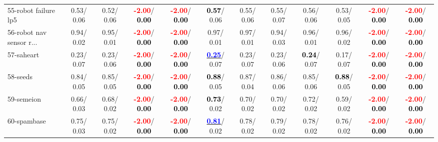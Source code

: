 \begin{table}[h]
\begin{center}
{\begin{tabular}{lc|c|c|c|c|c|c|c|c|c|c}
55-robot failure lp5 &   0.53/  0.06 &   0.52/  0.06 & \textcolor{red}{\textbf{ -2.00}}/\textcolor{black}{\textbf{  0.00}} & \textcolor{red}{\textbf{ -2.00}}/\textcolor{black}{\textbf{  0.00}} & \textcolor{black}{\textbf{  0.57}}/  0.06 &   0.55/  0.06 &   0.55/  0.07 &   0.56/  0.06 &   0.53/  0.05 & \textcolor{red}{\textbf{ -2.00}}/\textcolor{black}{\textbf{  0.00}} & \textcolor{red}{\textbf{ -2.00}}/\textcolor{black}{\textbf{  0.00}} \\
56-robot nav sensor r... &   0.94/  0.02 &   0.95/  0.01 & \textcolor{red}{\textbf{ -2.00}}/\textcolor{black}{\textbf{  0.00}} & \textcolor{red}{\textbf{ -2.00}}/\textcolor{black}{\textbf{  0.00}} &   0.97/  0.01 &   0.97/  0.01 &   0.94/  0.03 &   0.96/  0.01 &   0.96/  0.02 & \textcolor{red}{\textbf{ -2.00}}/\textcolor{black}{\textbf{  0.00}} & \textcolor{red}{\textbf{ -2.00}}/\textcolor{black}{\textbf{  0.00}} \\
57-saheart &   0.23/  0.07 &   0.23/  0.06 & \textcolor{red}{\textbf{ -2.00}}/\textcolor{black}{\textbf{  0.00}} & \textcolor{red}{\textbf{ -2.00}}/\textcolor{black}{\textbf{  0.00}} & \underline{\textcolor{blue}{\textbf{  0.25}}}/  0.07 &   0.23/  0.07 &   0.23/  0.06 & \textcolor{black}{\textbf{  0.24}}/  0.07 &   0.17/  0.07 & \textcolor{red}{\textbf{ -2.00}}/\textcolor{black}{\textbf{  0.00}} & \textcolor{red}{\textbf{ -2.00}}/\textcolor{black}{\textbf{  0.00}} \\
58-seeds &   0.84/  0.05 &   0.85/  0.05 & \textcolor{red}{\textbf{ -2.00}}/\textcolor{black}{\textbf{  0.00}} & \textcolor{red}{\textbf{ -2.00}}/\textcolor{black}{\textbf{  0.00}} & \textcolor{black}{\textbf{  0.88}}/  0.05 &   0.87/  0.04 &   0.86/  0.06 &   0.85/  0.06 & \textcolor{black}{\textbf{  0.88}}/  0.05 & \textcolor{red}{\textbf{ -2.00}}/\textcolor{black}{\textbf{  0.00}} & \textcolor{red}{\textbf{ -2.00}}/\textcolor{black}{\textbf{  0.00}} \\
59-semeion &   0.66/  0.03 &   0.68/  0.02 & \textcolor{red}{\textbf{ -2.00}}/\textcolor{black}{\textbf{  0.00}} & \textcolor{red}{\textbf{ -2.00}}/\textcolor{black}{\textbf{  0.00}} & \textcolor{black}{\textbf{  0.73}}/  0.02 &   0.70/  0.02 &   0.70/  0.02 &   0.72/  0.02 &   0.59/  0.02 & \textcolor{red}{\textbf{ -2.00}}/\textcolor{black}{\textbf{  0.00}} & \textcolor{red}{\textbf{ -2.00}}/\textcolor{black}{\textbf{  0.00}} \\
60-spambase &   0.75/  0.03 &   0.75/  0.02 & \textcolor{red}{\textbf{ -2.00}}/\textcolor{black}{\textbf{  0.00}} & \textcolor{red}{\textbf{ -2.00}}/\textcolor{black}{\textbf{  0.00}} & \underline{\textcolor{blue}{\textbf{  0.81}}}/  0.02 &   0.78/  0.02 &   0.79/  0.02 &   0.78/  0.02 &   0.76/  0.02 & \textcolor{red}{\textbf{ -2.00}}/\textcolor{black}{\textbf{  0.00}} & \textcolor{red}{\textbf{ -2.00}}/\textcolor{black}{\textbf{  0.00}} \\ \hline

\end{tabular}}
\end{center}
\end{table}
